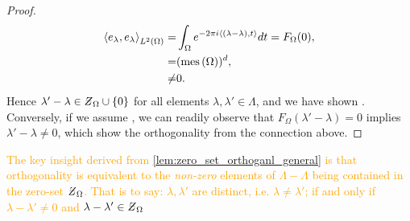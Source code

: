 \documentclass[../thesis.tex]{subfiles}
\begin{document}
{\begin{proof}
\begin{align*}
        \left \langle e_{\lambda},e_{\lambda}  \right \rangle_{L^2(\Omega)} = &\int_{\Omega} e^{-2 \pi i \langle(\lambda-\lambda),t\rangle} dt  = F_{\Omega}(0),\\
        =& (\operatorname{mes}\left(\Omega\right))^d,\\ 
        \neq& 0.
    \end{align*}
    Hence $\lambda'-\lambda \in \Zstroke_{\Omega} \cup \braq{0}$ for all elements $\lambda,\lambda'\in \Lambda$, and we have shown . Conversely, if we assume , we can readily observe that $F_{\Omega} (\lambda'-\lambda) = 0$ implies $\lambda'-\lambda\neq 0$, which show the orthogonality from the connection above.
\end{proof}
} %
\textcolor{orange}{  %
\begin{remark}\label{rem:key_insight}
    The key insight derived from \cref{lem:zero_set_orthoganl_general} is that orthogonality is equivalent to the \emph{non-zero} elements of $\Lambda - \Lambda$ being contained in the zero-set $\Zstroke_{\Omega}$.  %
    That is to say: $\lambda,\lambda'$ are distinct, i.e. $\lambda\neq\lambda'$; if and only if $\lambda-\lambda'\neq 0$ and $\lambda-\lambda' \in \Zstroke_{\Omega}$
\end{remark}
} %
\end{document}
